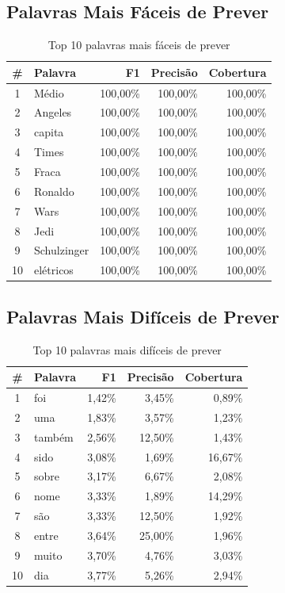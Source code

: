 \documentclass[12pt,a4paper]{article}
\begin{document}
\subsection{Palavras Mais Fáceis de Prever}

\begin{table}[H]
\centering
\begin{tabular}{clrrr}
\toprule
\textbf{\#} & \textbf{Palavra} & \textbf{F1} & \textbf{Precisão} & \textbf{Cobertura} \\
\midrule
1 & Médio & 100,00\% & 100,00\% & 100,00\% \\
2 & Angeles & 100,00\% & 100,00\% & 100,00\% \\
3 & capita & 100,00\% & 100,00\% & 100,00\% \\
4 & Times & 100,00\% & 100,00\% & 100,00\% \\
5 & Fraca & 100,00\% & 100,00\% & 100,00\% \\
6 & Ronaldo & 100,00\% & 100,00\% & 100,00\% \\
7 & Wars & 100,00\% & 100,00\% & 100,00\% \\
8 & Jedi & 100,00\% & 100,00\% & 100,00\% \\
9 & Schulzinger & 100,00\% & 100,00\% & 100,00\% \\
10 & elétricos & 100,00\% & 100,00\% & 100,00\% \\
\bottomrule
\end{tabular}
\caption{Top 10 palavras mais fáceis de prever}
\end{table}

\subsection{Palavras Mais Difíceis de Prever}

\begin{table}[H]
\centering
\begin{tabular}{clrrr}
\toprule
\textbf{\#} & \textbf{Palavra} & \textbf{F1} & \textbf{Precisão} & \textbf{Cobertura} \\
\midrule
1 & foi & 1,42\% & 3,45\% & 0,89\% \\
2 & uma & 1,83\% & 3,57\% & 1,23\% \\
3 & também & 2,56\% & 12,50\% & 1,43\% \\
4 & sido & 3,08\% & 1,69\% & 16,67\% \\
5 & sobre & 3,17\% & 6,67\% & 2,08\% \\
6 & nome & 3,33\% & 1,89\% & 14,29\% \\
7 & são & 3,33\% & 12,50\% & 1,92\% \\
8 & entre & 3,64\% & 25,00\% & 1,96\% \\
9 & muito & 3,70\% & 4,76\% & 3,03\% \\
10 & dia & 3,77\% & 5,26\% & 2,94\% \\
\bottomrule
\end{tabular}
\caption{Top 10 palavras mais difíceis de prever}
\end{table}
\end{document}
